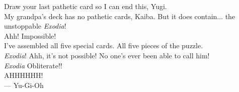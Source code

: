 \thispagestyle{empty}
{}

\vspace*{3cm}

\begin{center}
    Draw your last pathetic card so I can end this, Yugi.\\
    My grandpa's deck has no pathetic cards, Kaiba. But it does contain...  the unstoppable \emph{Exodia}!\\
    Ahh!  Impossible!\\
    I've assembled all five special cards. All five pieces of the puzzle.\\
    \emph{Exodia}! Ahh, it's not possible! No one's ever been able to call him!\\
    \emph{Exodia} Obliterate!!\\
    AHHHHHH!\\
    \medskip
    --- Yu-Gi-Oh    


\end{center}

\medskip